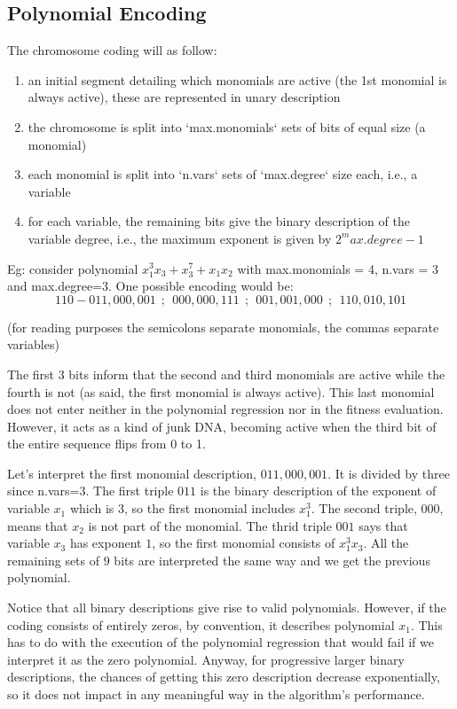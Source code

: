\documentclass[a4paper, 12pt]{article}
\begin{document}
\subsection{Polynomial Encoding}

The chromosome coding will as follow:
\begin{enumerate}
\item an initial segment detailing which monomials are active (the 1st monomial is always active), these are represented in unary description
\item the chromosome is split into `max.monomials` sets of bits of equal size 
  (a monomial)
\item each monomial is split into `n.vars` sets of `max.degree` size each, i.e., a variable
\item for each variable, the remaining bits give the binary description of the variable degree, i.e., the maximum exponent is given by $2^max.degree-1$
\end{enumerate}

Eg: consider polynomial $x_1^3 x_3 + x_3^7 + x_1 x_2$ with max.monomials = 4, n.vars = 3 and max.degree=3. One possible encoding would be:
$$110 - 011,000,001~~;~~000,000,111~~;~~001,001,000~~;~~110,010,101$$

(for reading purposes the semicolons separate monomials, the commas separate variables)

The first 3 bits inform that the second and third monomials are active while the fourth is not (as said, the first monomial is always active). This last monomial does not enter neither in the polynomial regression nor in the fitness evaluation. However, it acts as a kind of junk DNA, becoming active when the third bit of the entire sequence flips from 0 to 1.

Let's interpret the first monomial description, $011,000,001$. It is divided by three since n.vars=3. The first triple $011$ is the binary description of the exponent of variable $x_1$ which is 3, so the first monomial includes $x_1^3$. The second triple, $000$, means that $x_2$ is not part of the monomial. The thrid triple $001$ says that variable $x_3$ has exponent $1$, so the first monomial consists of $x_1^3 x_3$. All the remaining sets of $9$ bits are interpreted the same way and we get the previous polynomial.

Notice that all binary descriptions give rise to valid polynomials. However, if the coding consists of entirely zeros, by convention, it describes polynomial $x_1$. This has to do with the execution of the polynomial regression that would fail if we interpret it as the zero polynomial. Anyway, for progressive larger  binary descriptions, the chances of getting this zero description decrease exponentially, so it does not impact in any meaningful way in the algorithm's performance.
\end{document}
